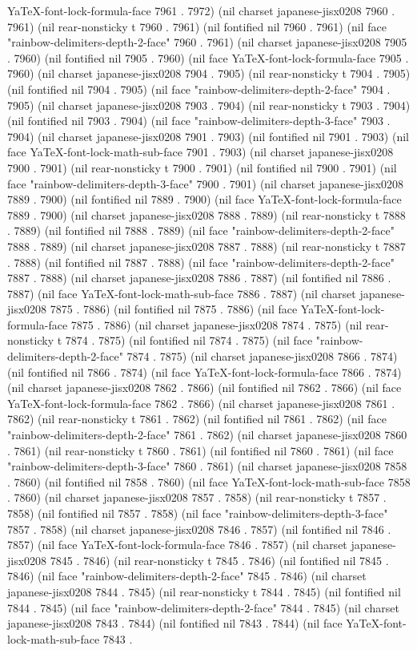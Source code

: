 YaTeX-font-lock-formula-face 7961 . 7972) (nil charset japanese-jisx0208 7960 . 7961) (nil rear-nonsticky t 7960 . 7961) (nil fontified nil 7960 . 7961) (nil face "rainbow-delimiters-depth-2-face" 7960 . 7961) (nil charset japanese-jisx0208 7905 . 7960) (nil fontified nil 7905 . 7960) (nil face YaTeX-font-lock-formula-face 7905 . 7960) (nil charset japanese-jisx0208 7904 . 7905) (nil rear-nonsticky t 7904 . 7905) (nil fontified nil 7904 . 7905) (nil face "rainbow-delimiters-depth-2-face" 7904 . 7905) (nil charset japanese-jisx0208 7903 . 7904) (nil rear-nonsticky t 7903 . 7904) (nil fontified nil 7903 . 7904) (nil face "rainbow-delimiters-depth-3-face" 7903 . 7904) (nil charset japanese-jisx0208 7901 . 7903) (nil fontified nil 7901 . 7903) (nil face YaTeX-font-lock-math-sub-face 7901 . 7903) (nil charset japanese-jisx0208 7900 . 7901) (nil rear-nonsticky t 7900 . 7901) (nil fontified nil 7900 . 7901) (nil face "rainbow-delimiters-depth-3-face" 7900 . 7901) (nil charset japanese-jisx0208 7889 . 7900) (nil fontified nil 7889 . 7900) (nil face YaTeX-font-lock-formula-face 7889 . 7900) (nil charset japanese-jisx0208 7888 . 7889) (nil rear-nonsticky t 7888 . 7889) (nil fontified nil 7888 . 7889) (nil face "rainbow-delimiters-depth-2-face" 7888 . 7889) (nil charset japanese-jisx0208 7887 . 7888) (nil rear-nonsticky t 7887 . 7888) (nil fontified nil 7887 . 7888) (nil face "rainbow-delimiters-depth-2-face" 7887 . 7888) (nil charset japanese-jisx0208 7886 . 7887) (nil fontified nil 7886 . 7887) (nil face YaTeX-font-lock-math-sub-face 7886 . 7887) (nil charset japanese-jisx0208 7875 . 7886) (nil fontified nil 7875 . 7886) (nil face YaTeX-font-lock-formula-face 7875 . 7886) (nil charset japanese-jisx0208 7874 . 7875) (nil rear-nonsticky t 7874 . 7875) (nil fontified nil 7874 . 7875) (nil face "rainbow-delimiters-depth-2-face" 7874 . 7875) (nil charset japanese-jisx0208 7866 . 7874) (nil fontified nil 7866 . 7874) (nil face YaTeX-font-lock-formula-face 7866 . 7874) (nil charset japanese-jisx0208 7862 . 7866) (nil fontified nil 7862 . 7866) (nil face YaTeX-font-lock-formula-face 7862 . 7866) (nil charset japanese-jisx0208 7861 . 7862) (nil rear-nonsticky t 7861 . 7862) (nil fontified nil 7861 . 7862) (nil face "rainbow-delimiters-depth-2-face" 7861 . 7862) (nil charset japanese-jisx0208 7860 . 7861) (nil rear-nonsticky t 7860 . 7861) (nil fontified nil 7860 . 7861) (nil face "rainbow-delimiters-depth-3-face" 7860 . 7861) (nil charset japanese-jisx0208 7858 . 7860) (nil fontified nil 7858 . 7860) (nil face YaTeX-font-lock-math-sub-face 7858 . 7860) (nil charset japanese-jisx0208 7857 . 7858) (nil rear-nonsticky t 7857 . 7858) (nil fontified nil 7857 . 7858) (nil face "rainbow-delimiters-depth-3-face" 7857 . 7858) (nil charset japanese-jisx0208 7846 . 7857) (nil fontified nil 7846 . 7857) (nil face YaTeX-font-lock-formula-face 7846 . 7857) (nil charset japanese-jisx0208 7845 . 7846) (nil rear-nonsticky t 7845 . 7846) (nil fontified nil 7845 . 7846) (nil face "rainbow-delimiters-depth-2-face" 7845 . 7846) (nil charset japanese-jisx0208 7844 . 7845) (nil rear-nonsticky t 7844 . 7845) (nil fontified nil 7844 . 7845) (nil face "rainbow-delimiters-depth-2-face" 7844 . 7845) (nil charset japanese-jisx0208 7843 . 7844) (nil fontified nil 7843 . 7844) (nil face YaTeX-font-lock-math-sub-face 7843 . 
